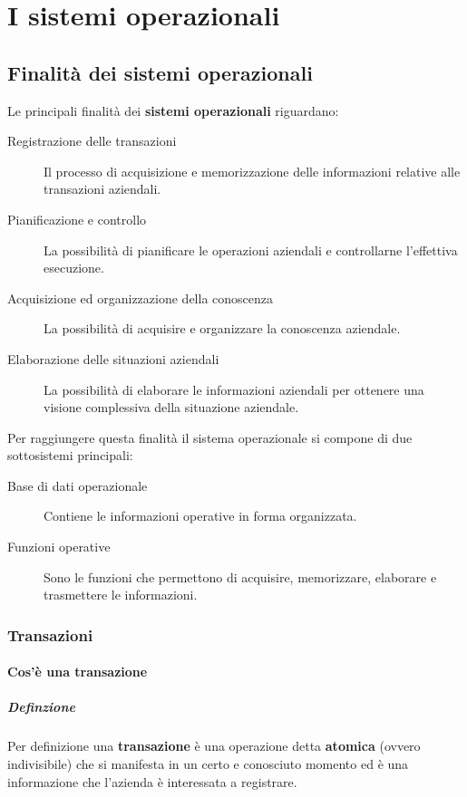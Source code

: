 \chapter{I sistemi operazionali}
\thispagestyle{chapterInit}

\section{Finalità dei sistemi operazionali}
    Le principali finalità dei \textbf{sistemi operazionali} riguardano:
    \begin{description}
        \item[Registrazione delle transazioni] Il processo di acquisizione e memorizzazione delle informazioni relative alle transazioni aziendali.
        \item[Pianificazione e controllo] La possibilità di pianificare le operazioni aziendali e controllarne l'effettiva esecuzione.
        \item[Acquisizione ed organizzazione della conoscenza] La possibilità di acquisire e organizzare la conoscenza aziendale.
        \item[Elaborazione delle situazioni aziendali] La possibilità di elaborare le informazioni aziendali per ottenere una visione complessiva della situazione aziendale.
    \end{description}
    Per raggiungere questa finalità il sistema operazionale si compone di due sottosistemi principali:
    \begin{description}
        \item[Base di dati operazionale] Contiene le informazioni operative in forma organizzata.
        \item[Funzioni operative] Sono le funzioni che permettono di acquisire, memorizzare, elaborare e trasmettere le informazioni.
    \end{description}
    \subsection{Transazioni}
        \subsubsection{Cos'è una transazione}
            \paragraph{Definzione} Per definizione una \textbf{transazione} è una operazione detta \textbf{atomica} (ovvero indivisibile) che si manifesta in un certo e conosciuto momento ed è una informazione che l'azienda è interessata a registrare.
